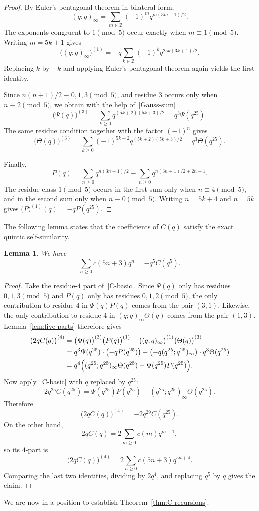 \documentclass[reqno]{amsart}
\theoremstyle{plain}
\newtheorem{lemma}{Lemma}
\theoremstyle{definition}
\theoremstyle{remark}
\numberwithin{equation}{section}
\begin{document}
\begin{proof}
By Euler's pentagonal theorem in bilateral form,
\[
(q;q)_\infty=\sum_{m\in\mathbb Z}(-1)^m q^{m(3m-1)/2}.
\]
The exponents congruent to $1\pmod{5}$ occur exactly when $m\equiv 1\pmod{5}$. Writing $m=5k+1$ gives
\[
\bigl((q;q)_\infty\bigr)^{(1)}=-q\sum_{k\in\mathbb Z}(-1)^k q^{25k(3k+1)/2}.
\]
Replacing $k$ by $-k$ and applying Euler's pentagonal theorem again yields the first identity.

Since $n(n+1)/2\equiv 0,1,3\pmod{5}$, and residue $3$ occurs only when $n\equiv 2\pmod{5}$, we obtain with the help of~\eqref{Gauss-sum}
\[
\bigl(\Psi(q)\bigr)^{(3)}=\sum_{k\ge 0} q^{(5k+2)(5k+3)/2}=q^3\Psi(q^{25}).
\]
The same residue condition together with the factor $(-1)^n$ gives
\[
\bigl(\Theta(q)\bigr)^{(3)}=\sum_{k\ge 0} (-1)^{5k+2}q^{(5k+2)(5k+3)/2}=q^3\Theta(q^{25}).
\]

Finally,
\[
P(q)=\sum_{n\ge 0}q^{n(3n+1)/2}-\sum_{n\ge 0}q^{n(3n+1)/2+2n+1}.
\]
The residue class $1\pmod{5}$ occurs in the first sum only when $n\equiv 4\pmod{5}$, and in the second sum only when $n\equiv 0\pmod{5}$. Writing $n=5k+4$ and $n=5k$ gives $\bigl(P\bigr)^{(1)}(q)=-qP(q^{25})$.
\end{proof}
%
The following lemma states that the coefficients of $C(q)$ satisfy the exact quintic self-similarity.
\begin{lemma}\label{lem:C-quintic}
We have
\begin{equation}\label{C-quintic}
\sum_{n\ge 0} c(5n+3)q^n=-q^5C(q^5).
\end{equation}
\end{lemma}
\begin{proof}
Take the residue-$4$ part of~\eqref{C-basic}. Since $\Psi(q)$ only has residues $0,1,3\pmod{5}$ and $P(q)$ only has residues $0,1,2\pmod{5}$, the only contribution to residue $4$ in $\Psi(q)P(q)$ comes from the pair $(3,1)$. Likewise, the only contribution to residue $4$ in $(q;q)_\infty\Theta(q)$ comes from the pair $(1,3)$. Lemma~\ref{lem:five-parts} therefore gives
\begin{align*}
\bigl(2qC(q)\bigr)^{(4)}
&=\bigl(\Psi(q)\bigr)^{(3)} \bigl(P(q)\bigr)^{(1)}-\bigl((q;q)_\infty\bigr)^{(1)} \bigl(\Theta(q)\bigr)^{(3)} \\
&=q^3\Psi(q^{25})\cdot\bigl(-qP(q^{25})\bigr)
   -\bigl(-q(q^{25};q^{25})_\infty\bigr)\cdot q^3\Theta(q^{25}) \\
&=q^4\Bigl((q^{25};q^{25})_\infty\Theta(q^{25})-\Psi(q^{25})P(q^{25})\Bigr).
\end{align*}
Now apply~\eqref{C-basic} with $q$ replaced by $q^{25}$:
\[
2q^{25}C(q^{25})=\Psi(q^{25})P(q^{25})-(q^{25};q^{25})_\infty\Theta(q^{25}).
\]
Therefore
\[
\bigl(2qC(q) \bigr)^{(4)}=-2q^{29}C(q^{25}).
\]
On the other hand,
\[
2qC(q)=2\sum_{m\ge 0}c(m)q^{m+1},
\]
so its $4$-part is
\[
\bigl(2qC(q) \bigr)^{(4)}=2\sum_{n\ge 0}c(5n+3)q^{5n+4}.
\]
Comparing the last two identities, dividing by $2q^4$, and replacing $q^5$ by $q$ gives the claim.
\end{proof}
We are now in a position to establish Theorem~\ref{thm:C-recursions}.
\end{document}
